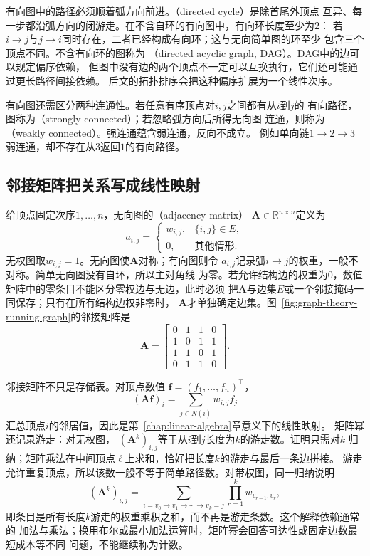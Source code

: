 有向图中的路径必须顺着弧方向前进。（directed cycle）是除首尾外顶点
互异、每一步都沿弧方向的闭游走。在不含自环的有向图中，有向环长度至少为\(2\)：
若\(i\to j\)与\(j\to i\)同时存在，二者已经构成有向环；这与无向简单图的环至少
包含三个顶点不同。不含有向环的图称为
（directed acyclic graph, DAG）。DAG中的边可以规定偏序依赖，
但图中没有边的两个顶点不一定可以互换执行，它们还可能通过更长路径间接依赖。
后文的拓扑排序会把这种偏序扩展为一个线性次序。

有向图还需区分两种连通性。若任意有序顶点对\(i,j\)之间都有从\(i\)到\(j\)的
有向路径，图称为（strongly connected）；若忽略弧方向后所得无向图
连通，则称为（weakly connected）。强连通蕴含弱连通，反向不成立。
例如单向链\(1\to2\to3\)弱连通，却不存在从\(3\)返回\(1\)的有向路径。

\subsection{邻接矩阵把关系写成线性映射}

给顶点固定次序\(1,\ldots,n\)，无向图的（adjacency matrix）
\(\bm{A}\in\mathbb{R}^{n\times n}\)定义为
\[
  a_{i,j}=\begin{cases}
    w_{i,j},&\{i,j\}\in E,\\
    0,&\text{其他情形}.
  \end{cases}
\]
无权图取\(w_{i,j}=1\)。无向图使\(\bm{A}\)对称；有向图则令
\(a_{i,j}\)记录弧\(i\to j\)的权重，一般不对称。简单无向图没有自环，所以主对角线
为零。若允许结构边的权重为\(0\)，数值矩阵中的零条目不能区分零权边与无边，此时必须
把\(\bm{A}\)与边集\(E\)或一个邻接掩码一同保存；只有在所有结构边权非零时，
\(\bm{A}\)才单独确定边集。图~\ref{fig:graph-theory-running-graph}的邻接矩阵是
\begin{equation}
  \bm{A}=\begin{bmatrix}
    0&1&1&0\\
    1&0&1&1\\
    1&1&0&1\\
    0&1&1&0
  \end{bmatrix}.
  \label{eq:graph-theory-running-adjacency}
\end{equation}

邻接矩阵不只是存储表。对顶点数值
\(\bm{f}=(f_1,\ldots,f_n)^{\top}\)，
\[
  (\bm{A}\bm{f})_i=\sum_{j\in N(i)}w_{i,j}f_j
\]
汇总顶点\(i\)的邻居值，因此是第~\ref{chap:linear-algebra}章意义下的线性映射。
矩阵幂还记录游走：对无权图，
\((\bm{A}^k)_{i,j}\)等于从\(i\)到\(j\)长度为\(k\)的游走数。证明只需对\(k\)
归纳；矩阵乘法在中间顶点\(\ell\)上求和，恰好把长度\(k\)的游走与最后一条边拼接。
游走允许重复顶点，所以该数一般不等于简单路径数。对带权图，同一归纳说明
\[
  (\bm{A}^k)_{i,j}
  =\sum_{i=v_0\to v_1\to\cdots\to v_k=j}
  \prod_{r=1}^{k}w_{v_{r-1},v_r},
\]
即条目是所有长度\(k\)游走的权重乘积之和，而不再是游走条数。这个解释依赖通常的
加法与乘法；换用布尔或最小加法运算时，矩阵幂会回答可达性或固定边数最短成本等不同
问题，不能继续称为计数。

